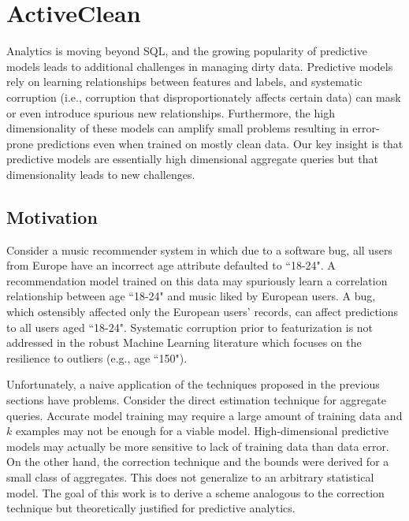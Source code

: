 \section{ActiveClean}



Analytics is moving beyond SQL, and the growing popularity of predictive models \cite{bdas, alexandrov2014stratosphere, crotty2014tupleware, hellerstein2012madlib} leads to additional challenges in managing dirty data.
Predictive models rely on learning relationships between features and labels, and systematic corruption \cite{taylor1982introduction} (i.e., corruption that disproportionately affects certain data) can mask or even introduce spurious new relationships.
Furthermore, the high dimensionality of these models can amplify small problems \cite{xiaofeature} resulting in error-prone predictions even when trained on mostly clean data.
Our key insight is that predictive models are essentially high dimensional aggregate queries but that dimensionality leads to new challenges.

\subsection{Motivation}
Consider a music recommender system in which due to a software bug, all users from Europe have an incorrect age attribute defaulted to ``18-24".
A recommendation model trained on this data may spuriously learn a correlation relationship between age ``18-24" and music liked by European users.
A bug, which ostensibly affected only the European users' records, can affect predictions to all users aged ``18-24".
Systematic corruption prior to featurization is not addressed in the robust Machine Learning literature which focuses on the resilience to outliers (e.g., age ``150").


Unfortunately, a naive application of the techniques proposed in the previous sections have problems.
Consider the direct estimation technique for aggregate queries.
Accurate model training may require a large amount of training data and $k$ examples may not be enough for a viable model.
High-dimensional predictive models may actually be more sensitive to lack of training data than data error.
On the other hand, the correction technique and the bounds were derived for a small class of aggregates.
This does not generalize to an arbitrary statistical model. 
The goal of this work is to derive a scheme analogous to the correction technique but theoretically justified for predictive analytics.


